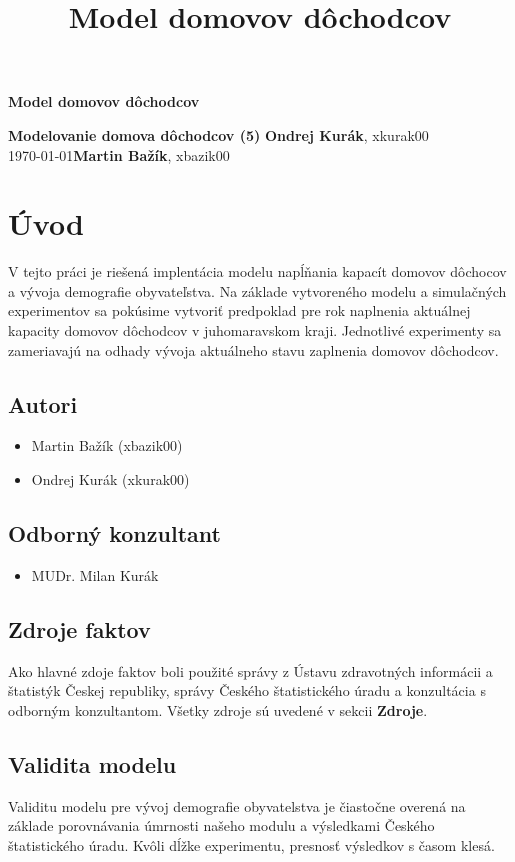 \documentclass[a4paper, 11pt]{article}
\title{Model domovov dôchodcov}
\begin{document}
\begin{center}
\Large \textbf{Model domovov dôchodcov}
\end{center}
\noindent
\large{\textbf{Modelovanie domova dôchodcov (5)}} \hfill \textbf{Ondrej Kurák}, xkurak00 \\
\today \hfill \textbf{Martin Bažík}, xbazik00 \\


\section{Úvod}
V tejto práci je riešená implentácia modelu\cite[str. 7]{IMS} napĺňania kapacít domovov dôchocov a vývoja demografie obyvateľstva. Na základe vytvoreného modelu a simulačných experimentov\cite[str. 8]{IMS} sa pokúsime vytvoriť predpoklad pre rok naplnenia aktuálnej kapacity domovov dôchodcov v juhomaravskom kraji. Jednotlivé experimenty sa zameriavajú na odhady vývoja aktuálneho stavu zaplnenia domovov dôchodcov.
\subsection{Autori}
\begin{itemize}
\item Martin Bažík (xbazik00)
\item Ondrej Kurák (xkurak00)
\end{itemize}
\subsection{Odborný konzultant}
\begin{itemize}
\item MUDr. Milan Kurák
\end{itemize}
\subsection{Zdroje faktov}
Ako hlavné zdoje faktov boli použité správy z Ústavu zdravotných informácii a štatistýk Českej republiky\cite{demografia}\cite{domovy}, správy Českého štatistického úradu\cite{zomreli} a konzultácia s odborným konzultantom. Všetky zdroje sú uvedené v sekcii \textbf{Zdroje}.  
\subsection{Validita modelu}
Validitu modelu\cite[str. 37]{IMS} pre vývoj demografie obyvatelstva je čiastočne overená na základe porovnávania úmrnosti našeho modulu a výsledkami Českého štatistického úradu\cite{lifet}. Kvôli dĺžke experimentu, presnosť výsledkov s časom klesá.
\end{document}
